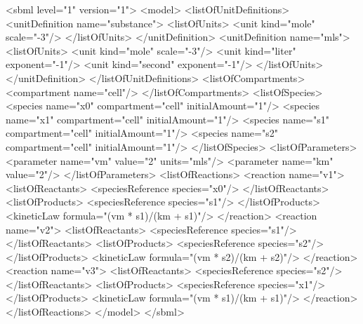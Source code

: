 \documentclass[10pt]{cekarticle}
\newcommand{\changed}[1]{\textcolor{BrickRed}{#1}}
\begin{document}
\begin{example}
<sbml level="1" version="1">
    <model>
        <listOfUnitDefinitions>
            <unitDefinition name="substance">
                <listOfUnits>
                    <unit kind="mole" scale="-3"/>
                </listOfUnits>
            </unitDefinition>
            <unitDefinition name="mls">
                <listOfUnits>
                    <unit kind="mole"   scale="-3"/>
                    <unit kind="liter"  exponent="-1"/>
                    <unit kind="second" exponent="-1"/>
                </listOfUnits>
            </unitDefinition>
        </listOfUnitDefinitions>
        <listOfCompartments>
            <compartment name="cell"/>
        </listOfCompartments>
        <listOfSpecies>
            <\changed{species} name="x0" compartment="cell" initialAmount="1"/>
            <\changed{species} name="x1" compartment="cell" initialAmount="1"/>
            <\changed{species} name="s1" compartment="cell" initialAmount="1"/>
            <\changed{species} name="s2" compartment="cell" initialAmount="1"/>
        </listOfSpecies>
        <listOfParameters>
            <parameter name="vm" value="2" units="mls"/>
            <parameter name="km" value="2"/>
        </listOfParameters>
        <listOfReactions>
            <reaction name="v1">
                <listOfReactants>
                    <\changed{speciesReference} \changed{species=}"x0"/>
                </listOfReactants>
                <listOfProducts>
                    <\changed{speciesReference} \changed{species=}"s1"/>
                </listOfProducts>
                <kineticLaw formula="(vm * s1)/(km + s1)"/>
            </reaction>
            <reaction name="v2">
                <listOfReactants>
                    <\changed{speciesReference} \changed{species=}"s1"/>
                </listOfReactants>
                <listOfProducts>
                    <\changed{speciesReference} \changed{species=}"s2"/>
                </listOfProducts>
                <kineticLaw formula="(vm * s2)/(km + s2)"/>
            </reaction>
            <reaction name="v3">
                <listOfReactants>
                    <\changed{speciesReference} \changed{species=}"s2"/>
                </listOfReactants>
                <listOfProducts>
                    <\changed{speciesReference} \changed{species=}"x1"/>
                </listOfProducts>
                <kineticLaw formula="(vm * s1)/(km + s1)"/>
            </reaction>
        </listOfReactions>
    </model>
</sbml>
\end{example}
\end{document}
